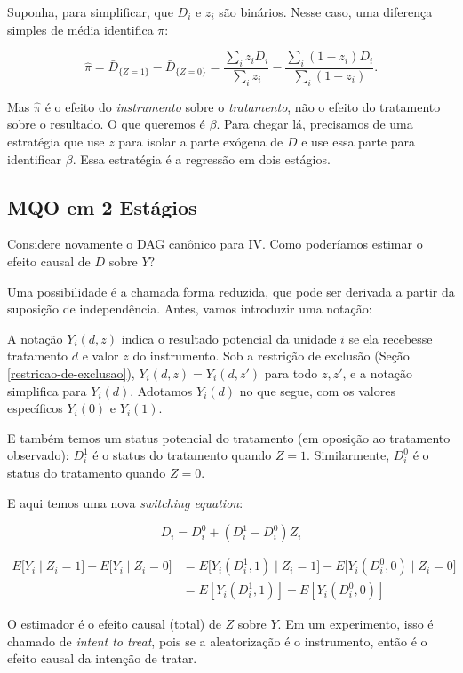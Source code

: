 \documentclass[
]{article}
\begin{document}
Suponha, para simplificar, que \(D_i\) e \(z_i\) são binários. Nesse caso, uma diferença simples de média identifica \(\pi\):

\[\hat{\pi} = \bar{D}_{\{Z=1\}} - \bar{D}_{\{Z=0\}} = \frac{\sum_{i} z_i D_i}{\sum_{i} z_i} - \frac{\sum_{i} (1-z_i) D_i}{\sum_{i} (1-z_i)}.\]

Mas \(\hat\pi\) é o efeito do \emph{instrumento} sobre o \emph{tratamento}, não o efeito do tratamento sobre o resultado. O que queremos é \(\beta\). Para chegar lá, precisamos de uma estratégia que use \(z\) para isolar a parte exógena de \(D\) e use essa parte para identificar \(\beta\). Essa estratégia é a regressão em dois estágios.

\subsection{MQO em 2 Estágios}\label{mqo-em-2-estuxe1gios}

Considere novamente o DAG canônico para IV. Como poderíamos estimar o efeito causal de \(D\) sobre \(Y\)?

Uma possibilidade é a chamada forma reduzida, que pode ser derivada a partir da suposição de independência. Antes, vamos introduzir uma notação:

A notação \(Y_i(d, z)\) indica o resultado potencial da unidade \(i\) se ela recebesse tratamento \(d\) e valor \(z\) do instrumento. Sob a restrição de exclusão (Seção \ref{restricao-de-exclusao}), \(Y_i(d, z) = Y_i(d, z')\) para todo \(z, z'\), e a notação simplifica para \(Y_i(d)\). Adotamos \(Y_i(d)\) no que segue, com os valores específicos \(Y_i(0)\) e \(Y_i(1)\).

E também temos um status potencial do tratamento (em oposição ao tratamento observado): \(D^1_i\) é o status do tratamento quando \(Z=1\). Similarmente, \(D^0_i\) é o status do tratamento quando \(Z=0\).

E aqui temos uma nova \emph{switching equation}:

\[D_i = D^0_i + (D^1_i - D^0_i)Z_i\]

\begin{align}
   E\big[Y_i\mid Z_i=1\big]-E\big[Y_i\mid Z_i=0\big] & = E\big[Y_i(D_i^1,1)\mid Z_i=1\big]-
   E\big[Y_i(D_i^0,0)\mid Z_i=0\big]
   \\
                                    & = E[Y_i(D_i^1,1)] - E[Y_i(D_i^0,0)]  
\end{align}

O estimador é o efeito causal (total) de \(Z\) sobre \(Y\). Em um experimento, isso é chamado de \emph{intent to treat}, pois se a aleatorização é o instrumento, então é o efeito causal da intenção de tratar.
\end{document}
